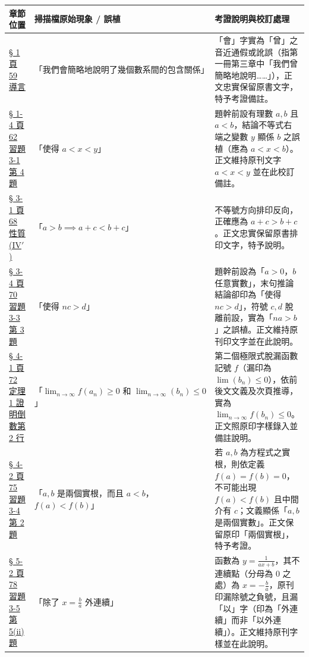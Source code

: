 \documentclass[a4paper,12pt,twoside]{article}
\begin{document}
\begin{table}[H]
\centering
\small
\renewcommand{\arraystretch}{1.35}
\begin{tabularx}{\textwidth}{|p{3.2cm}|p{3.6cm}|X|}
\hline
\textbf{章節位置} & \textbf{掃描檔原始現象 / 誤植} & \textbf{考證說明與校訂處理} \\ \hline

\hyperref[note:b2-ch3-ceng]{§ 1 頁 59 導言} & 
「我們會簡略地說明了幾個數系間的包含關係」 & 
「會」字實為「曾」之音近通假或訛誤（指第一冊第三章中「我們曾簡略地說明……」），正文忠實保留原書文字，特予考證備註。 \\ \hline

\hyperref[note:b2-ch3-ex3-1-q4-xy]{§ 1-4 頁 62 習題 3-1 第 4 題} & 
「使得 $a < x < y$」 & 
題幹前設有理數 $a, b$ 且 $a < b$，結論不等式右端之變數 $y$ 顯係 $b$ 之誤植（應為 $a < x < b$）。正文維持原刊文字 $a < x < y$ 並在此校訂備註。 \\ \hline

\hyperref[note:b2-ch3-prop-iv-prime]{§ 3-1 頁 68 性質 (IV$'$)} & 
「$a > b \implies a+c < b+c$」 & 
不等號方向排印反向，正確應為 $a+c > b+c$。正文忠實保留原書排印文字，特予說明。 \\ \hline

\hyperref[note:b2-ch3-ex3-3-q3-nc-d]{§ 3-4 頁 70 習題 3-3 第 3 題} & 
「使得 $nc > d$」 & 
題幹前設為「$a > 0$，$b$ 任意實數」，末句推論結論卻印為「使得 $nc > d$」，符號 $c, d$ 脫離前設，實為「$na > b$」之誤植。正文維持原刊印文字並在此說明。 \\ \hline

\hyperref[note:b2-ch3-lim-bn]{§ 4-1 頁 72 定理 1 證明倒數第 2 行} & 
「$\lim_{n\to\infty} f(a_n) \ge 0 \text{ 和 } \lim_{n\to\infty} (b_n) \le 0$」 & 
第二個極限式脫漏函數記號 $f$（漏印為 $\lim (b_n) \le 0$），依前後文文義及次頁推導，實為 $\lim_{n\to\infty} f(b_n) \le 0$。正文照原印字樣錄入並備註說明。 \\ \hline

\hyperref[note:b2-ch3-ex3-4-q2-roots]{§ 4-2 頁 75 習題 3-4 第 2 題} & 
「$a, b$ 是兩個實根，而且 $a < b$，$f(a) < f(b)$」 & 
若 $a, b$ 為方程式之實根，則依定義 $f(a) = f(b) = 0$，不可能出現 $f(a) < f(b)$ 且中間介有 $c$；文義顯係「$a, b$ 是兩個實數」。正文保留原印「兩個實根」，特予考證。 \\ \hline

\hyperref[note:b2-ch3-ex3-5-q5-sign]{§ 5-2 頁 78 習題 3-5 第 5(ii) 題} & 
「除了 $x = \frac{b}{a}$ 外連續」 & 
函數為 $y = \frac{1}{ax+b}$，其不連續點（分母為 0 之處）為 $x = -\frac{b}{a}$，原刊印漏除號之負號，且漏「以」字（印為「外連續」而非「以外連續」）。正文維持原刊字樣並在此說明。 \\ \hline

\end{tabularx}
\end{table}

\clearpage
\tableofcontents
\newpage


\end{document}
